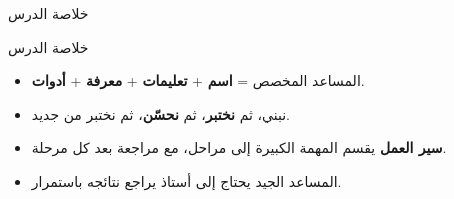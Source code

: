 \documentclass[aspectratio=169, 11pt, xcolor={table}]{beamer}
\begin{document}
\begin{frame}{خلاصة الدرس}
    \begin{tbox}{\faCheckCircle\quad خلاصة الدرس}
        \begin{itemize}
            \item المساعد المخصص = \textbf{اسم} + \textbf{تعليمات} + \textbf{معرفة} + \textbf{أدوات}.
            \item نبني، ثم \textbf{نختبر}، ثم \textbf{نحسّن}، ثم نختبر من جديد.
            \item \textbf{سير العمل} يقسم المهمة الكبيرة إلى مراحل، مع مراجعة بعد كل مرحلة.
            \item المساعد الجيد يحتاج إلى أستاذ يراجع نتائجه باستمرار.
        \end{itemize}
    \end{tbox}
\end{frame}
\end{document}
